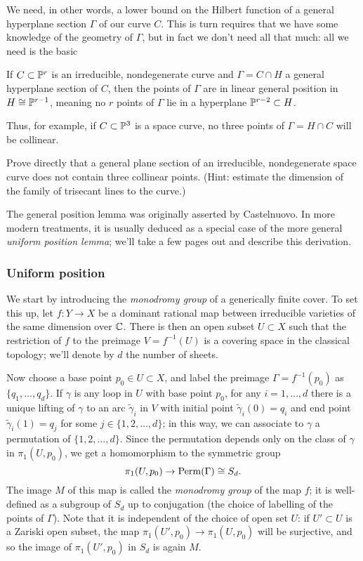 We need, in other words, a lower bound on the Hilbert function of a general hyperplane section $\Gamma$ of our curve $C$. This is turn requires that we have some knowledge of the geometry of $\Gamma$, but  in fact we don't need all that much: all we need is the basic

\begin{lemma}\label{general position lemma}
If $C \subset {\mathbb P}^r$ is an irreducible, nondegenerate curve and $\Gamma = C \cap H$ a general hyperplane section of $C$, then the points of $\Gamma$ are in linear general position in $H \cong {\mathbb P}^{r-1}$, meaning no $r$ points of $\Gamma$ lie in a hyperplane ${\mathbb P}^{r-2} \subset H$.
\end{lemma}
Thus, for example, if $C \subset {\mathbb P}^3$ is a space curve, no three points of $\Gamma = H \cap C$ will be collinear.

\begin{exercise}
Prove directly that a general plane section of an irreducible, nondegenerate space curve does not contain three collinear points. (Hint: estimate the dimension of the family of trisecant lines to the curve.)
\end{exercise}

The general position lemma was originally asserted by Castelnuovo. In more modern treatments, it is usually deduced as a special case of the more general \emph{uniform position lemma}; we'll take a few pages out and describe this derivation.

\subsubsection{Uniform position} We start by introducing the \emph{monodromy group} of a generically finite cover. To set this up, let $f : Y \to X$ be a dominant rational map between irreducible varieties of the same dimension over ${\mathbb C}$. There is then an open subset $U \subset X$ such that the restriction of $f$ to the preimage $V = f^{-1}(U)$ is a covering space in the classical topology; we'll denote by $d$ the number of sheets.

Now choose a base point $p_0 \in U \subset X$, and label the preimage $\Gamma = f^{-1}(p_0)$ as $\{q_1,\dots,q_d\}$. If $\gamma$ is any loop in $U$ with base point $p_0$, for any $i = 1, \dots, d$ there is a unique lifting of $\gamma$ to an arc $\tilde \gamma_i$ in $V$ with initial point $\tilde \gamma_i(0) = q_i$ and end point $\tilde \gamma_i(1) = q_j$ for some $j \in \{1,2,\dots,d\}$; in this way, we can associate to $\gamma$ a permutation of $\{1,2,\dots,d\}$. 
Since the permutation depends only on the class of $\gamma$ in $\pi_1(U,p_0)$, we get a homomorphism to the symmetric group
$$
\pi_1(U,p_0)  \to {\rm Perm}(\Gamma) \cong S_d.
$$
The image $M$ of this map is called the \emph{monodromy group} of the map $f$; it is well-defined as a subgroup of  $S_d$ up to conjugation (the choice of labelling of the points of $\Gamma$). Note that it is independent of the choice of open set $U$: if $U' \subset U$ is a Zariski open subset, the map $\pi_1(U', p_0) \to \pi_1(U,p_0)$ will be surjective, and so the image of $\pi_1(U', p_0)$ in $S_d$ is again $M$.

